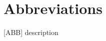 \section*{Abbreviations}
\thispagestyle{plain}
\begin{acronym}[PECVD]
	[ABB] description
	
\end{acronym}